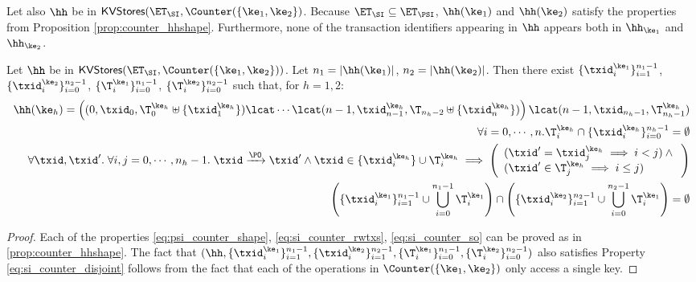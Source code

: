 Let also $\hh$ be in $\mathsf{KVStores}(\ET_{\SI}, \Counter(\{\ke_1, \ke_2\})$. Because 
$\ET_{\SI} \subseteq \ET_{\PSI}$, $\hh(\ke_1)$ and $\hh(\ke_2)$ satisfy the 
properties from Proposition \ref{prop:counter_hhshape}. 
Furthermore, none of the transaction identifiers appearing in $\hh$ appears 
both in $\hh_{\ke_1}$ and $\hh_{\ke_2}$.
\begin{proposition}
\label{prop:si_counter_hhshape1}
Let $\hh$ be in $\mathsf{KVStores}(\ET_{\SI}, \Counter(\{\ke_1, \ke_2\}))$. 
Let $n_1 = \lvert \hh(\ke_1) \rvert$, $n_2 = \lvert \hh(\ke_2) \rvert$. 
Then there exist $\{\txid_{i}^{\ke_1}\}_{i=1}^{n_1 - 1}$, $\{\txid_{i}^{\ke_2}\}_{i=0}^{n_2 - 1}$, 
$\{\T_{i}^{\ke_1}\}_{i=0}^{n_1-1}$, $\{\T_{i}^{\ke_2}\}_{i=0}^{n_2 - 1}$ such that, 
for $h = 1,2$: 
\begin{align}
\hh(\ke_{h}) = \left( (0, \txid_{0}, \T^{\ke_{h}}_{0} \uplus \{\txid^{\ke_{h}}_1\}) \lcat \cdots \lcat (n-1, \txid^{\ke_{h}}_{n-1}, \T_{n_{h}-2} \uplus \{\txid^{\ke_{h}}_{n}\}) \right) 
\lcat (n-1, \txid_{n_{h} - 1}, \T^{\ke_{h}}_{n_{h} - 1}) \label{eq:si_counter_shape}\\
\forall i=0,\cdots,n.\T^{\ke_{h}}_{i} \cap \{\txid^{\ke_{h}}_{i}\}_{i=0}^{n_{h}-1} = \emptyset \label{eq:si_counter_rwtxs}\\
\forall \txid, \txid'.\;\forall i,j=0,\cdots, n_{h} - 1.\; \txid \xrightarrow{\PO} \txid' 
\wedge \txid \in \{\txid^{\ke_{h}}_{i}\} \cup \T^{\ke_{h}}_{i} \implies 
\left(\begin{array}{l}
(\txid' = \txid^{\ke_{h}}_{j} \implies i < j) \wedge {} \\
(\txid' \in \T^{\ke_{h}}_{j} \implies i \leq j) \\
\end{array}\right) \label{eq:si_counter_so}\\
\left( \{\txid^{\ke_{1}}_{i}\}_{i=1}^{n_1 -1} \cup \bigcup_{i=0}^{n_1 - 1} \T_{i}^{\ke_1} \right) \cap 
\left( \{\txid^{\ke_{2}}_{i}\}_{i=1}^{n_2 -1} \cup \bigcup_{i=0}^{n_2 - 1} \T_{i}^{\ke_1} \right) = \emptyset \label{eq:si_counter_disjoint}
\end{align}

\end{proposition}

\begin{proof}
Each of the properties \eqref{eq:psi_counter_shape}, \eqref{eq:si_counter_rwtxs}, \eqref{eq:si_counter_so} 
can be proved as in \cref{prop:counter_hhshape}. The fact that $(\hh, \{\txid_{i}^{\ke_{1}}\}_{i=1}^{n_1 - 1}, \{\txid^{\ke_2}_{i}\}_{i=1}^{n_2 - 1}, 
\{\T_{i}^{\ke_1}\}_{i=0}^{n_1 - 1}, \{\T_{i}^{\ke_2}\}_{i=0}^{n_2-1})$ also satisfies Property \eqref{eq:si_counter_disjoint} 
follows from the fact that each of the operations in $\Counter(\{\ke_1, \ke_2\})$ only access a single key. 
\end{proof}

